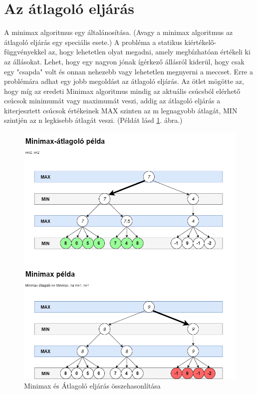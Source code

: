 \documentclass[twoside, a4paper, 12pt]{book}
\begin{document}
\section{Az átlagoló eljárás}
A minimax algoritmus egy általánosítása. (Avagy a minimax algoritmus az átlagoló eljárás egy speciális esete.) A probléma a statikus kiértékelő-függvényekkel az, hogy lehetetlen olyat megadni, amely megbízhatóan értékeli ki az állásokat. Lehet, hogy egy nagyon jónak ígérkező állásról kiderül, hogy csak egy "csapda" volt és onnan nehezebb vagy lehetetlen megnyerni a meccset. Erre a problémára adhat egy jobb megoldást az átlagoló eljárás. Az ötlet mögötte az, hogy míg az eredeti Minimax algoritmus mindig az aktuális csúcsból elérhető csúcsok minimumát vagy maximumát veszi, addig az átlagoló eljárás a kiterjesztett csúcsok értékeinek MAX szinten az m legnagyobb átlagát, MIN szintjén az n legkisebb átlagát veszi. (Példát lásd \ref{fig:minimaxVsAverageExample}. ábra.)\cite{bevMiHu}

\begin{figure}[htbp]
	\centering
	\includegraphics[width=\textwidth]{img/minimaxVsAverageExample.png}
	\caption{Minimax és Átlagoló eljárás összehasonlítása\cite{bevMiHu}}
	\label{fig:minimaxVsAverageExample}
\end{figure}
\end{document}
